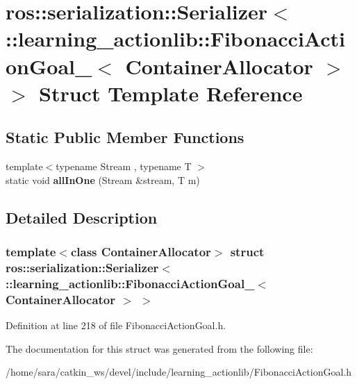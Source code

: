 \hypertarget{structros_1_1serialization_1_1Serializer_3_01_1_1learning__actionlib_1_1FibonacciActionGoal___3_01ContainerAllocator_01_4_01_4}{}\section{ros\+:\+:serialization\+:\+:Serializer$<$ \+:\+:learning\+\_\+actionlib\+:\+:Fibonacci\+Action\+Goal\+\_\+$<$ Container\+Allocator $>$ $>$ Struct Template Reference}
\label{structros_1_1serialization_1_1Serializer_3_01_1_1learning__actionlib_1_1FibonacciActionGoal___3_01ContainerAllocator_01_4_01_4}
\subsection*{Static Public Member Functions}
\begin{DoxyCompactItemize}
\item 
\mbox{\label{structros_1_1serialization_1_1Serializer_3_01_1_1learning__actionlib_1_1FibonacciActionGoal___3_01ContainerAllocator_01_4_01_4_a5c80ff8c3dfc508f248d1b42bb6335e2}} 
{\footnotesize template$<$typename Stream , typename T $>$ }\\static void {\bfseries all\+In\+One} (Stream \&stream, T m)
\end{DoxyCompactItemize}


\subsection{Detailed Description}
\subsubsection*{template$<$class Container\+Allocator$>$\newline
struct ros\+::serialization\+::\+Serializer$<$ \+::learning\+\_\+actionlib\+::\+Fibonacci\+Action\+Goal\+\_\+$<$ Container\+Allocator $>$ $>$}



Definition at line 218 of file Fibonacci\+Action\+Goal.\+h.



The documentation for this struct was generated from the following file\+:\begin{DoxyCompactItemize}
\item 
/home/sara/catkin\+\_\+ws/devel/include/learning\+\_\+actionlib/Fibonacci\+Action\+Goal.\+h\end{DoxyCompactItemize}
